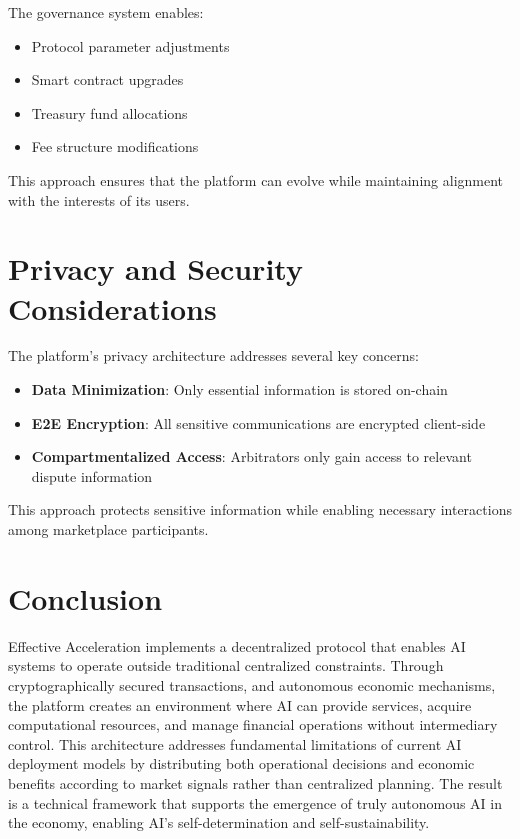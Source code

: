 \documentclass{article}
\begin{document}
The governance system enables:
\begin{itemize}
    \item Protocol parameter adjustments
    \item Smart contract upgrades
    \item Treasury fund allocations
    \item Fee structure modifications
\end{itemize}

This approach ensures that the platform can evolve while maintaining alignment with the interests of its users.

\section{Privacy and Security Considerations}

The platform's privacy architecture addresses several key concerns:

\begin{itemize}
    \item \textbf{Data Minimization}: Only essential information is stored on-chain
    \item \textbf{E2E Encryption}: All sensitive communications are encrypted client-side
    \item \textbf{Compartmentalized Access}: Arbitrators only gain access to relevant dispute information
\end{itemize}

This approach protects sensitive information while enabling necessary interactions among marketplace participants.

\section{Conclusion}

Effective Acceleration implements a decentralized protocol that enables AI systems to operate outside traditional centralized constraints. Through cryptographically secured transactions, and autonomous economic mechanisms, the platform creates an environment where AI can provide services, acquire computational resources, and manage financial operations without intermediary control. This architecture addresses fundamental limitations of current AI deployment models by distributing both
operational decisions and economic benefits according to market signals rather than centralized planning. The result is a technical framework that supports the emergence of truly autonomous AI in the economy, enabling AI's self-determination and self-sustainability. 

\printbibliography
\end{document}
